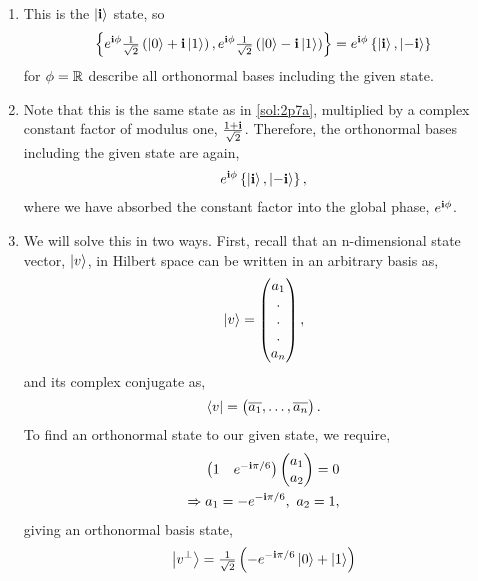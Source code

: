 \begin{enumerate}[label=\alph*.,ref={Sol.~\thesection\alph*}]
\label{sol:2p7}
    \item \label{sol:2p7a} This is the $\ket{\mathbf{i}}$ state, so
    \begin{align*}
        \left \{ e^{\mathbf{i} \phi} \tfrac{1}{\sqrt{2}} \left ( \ket{0} + \mathbf{i} \ket{1} \right ), e^{\mathbf{i} \phi} \tfrac{1}{\sqrt{2}} \left ( \ket{0} - \mathbf{i} \ket{1} \right ) \right \} = e^{\mathbf{i} \phi} \left \{ \ket{\mathbf{i}}, \ket{-\mathbf{i}} \right \}
    \end{align*}
    for $\phi = \mathbb{R}$ describe all orthonormal bases including the given state.
    \item Note that this is the same state as in \ref{sol:2p7a}, multiplied by a complex constant factor of modulus one, $\tfrac{1+\mathbf{i}}{\sqrt{2}}$.
    Therefore, the orthonormal bases including the given state are again,
    \begin{align*}
        e^{\mathbf{i} \phi} \left \{ \ket{\mathbf{i}}, \ket{-\mathbf{i}} \right \},
    \end{align*}
    where we have absorbed the constant factor into the global phase, $e^{\mathbf{i} \phi}$.
    \item We will solve this in two ways.
    First, recall that an n-dimensional state vector, $\ket{v}$, in Hilbert space can be written in an arbitrary basis as,
    \begin{align*}
        \ket{v} = \begin{pmatrix} a_1 \\ . \\ . \\ . \\ a_n \end{pmatrix},
    \end{align*}
    and its complex conjugate as,
    \begin{align*}
        \bra{v} = \begin{pmatrix} \overline{a_1}, \ldots, \overline{a_n} \end{pmatrix}.
    \end{align*}
    To find an orthonormal state to our given state, we require,
    \begin{align*}
        \begin{pmatrix} 1 & e^{-\mathbf{i} \pi/6} \end{pmatrix} \begin{pmatrix} a_1 \\ a_2 \end{pmatrix} = 0 \\
        \Rightarrow a_1 = -e^{-\mathbf{i} \pi / 6},~a_2 = 1,
    \end{align*}
    giving an orthonormal basis state,
    \begin{align*}
        \ket{v^\perp} = \tfrac{1}{\sqrt{2}} \left (-e^{-\mathbf{i} \pi/6} \ket{0} + \ket{1} \right )
    \end{align*}


\end{enumerate}
